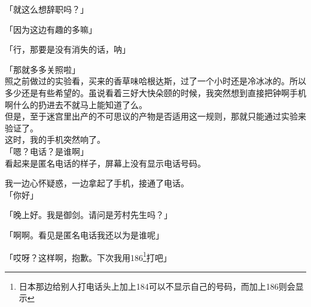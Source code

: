 「就这么想辞职吗？」

「因为这边有趣的多嘛」

「行，那要是没有消失的话，呐」

「那就多多关照啦」\\

照之前做过的实验看，买来的香草味哈根达斯，过了一个小时还是冷冰冰的。所以多少还是有些希望的。虽说看着三好大快朵颐的时候，我突然想到直接把钟啊手机啊什么的扔进去不就马上能知道了么。\\

但是，至于迷宫里出产的不可思议的产物是否适用这一规则，那就只能通过实验来验证了。\\

这时，我的手机突然响了。\\

「嗯？电话？是谁啊」\\

看起来是匿名电话的样子，屏幕上没有显示电话号码。

我一边心怀疑惑，一边拿起了手机，接通了电话。\\

「你好」

「晚上好。我是御剑。请问是芳村先生吗？」

「啊啊。看见是匿名电话我还以为是谁呢」

「哎呀？这样啊，抱歉。下次我用186\footnote{日本那边给别人打电话头上加上184可以不显示自己的号码，而加上186则会显示}打吧」

